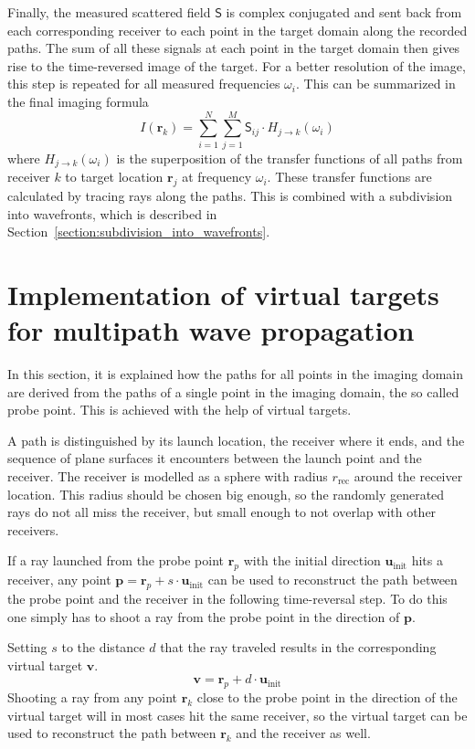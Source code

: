 Finally, the measured scattered field \(\mathsf{S}\) is complex conjugated and sent back from each corresponding receiver to each point in the target domain along the recorded paths.
The sum of all these signals at each point in the target domain then gives rise to the time-reversed image of the target.
For a better resolution of the image, this step is repeated for all measured frequencies \(\omega_i\).
This can be summarized in the final imaging formula
\begin{equation}
    I(\mathbf{r}_k) = \sum_{i=1}^{N} \sum_{j=1}^{M} \mathsf{S}_{ij} \cdot H_{j \rightarrow k}(\omega_i)
\end{equation}
where \(H_{j \rightarrow k}(\omega_i )\) is the superposition of the transfer functions of all paths from receiver \(k\) to target location \(\mathbf{r}_j\) at frequency \(\omega_i\).
These transfer functions are calculated by tracing rays along the paths.
This is combined with a subdivision into wavefronts, which is described in Section~\ref{section:subdivision_into_wavefronts}.


\section{Implementation of virtual targets for multipath wave propagation}\label{section:virtual_targets}
In this section, it is explained how the paths for all points in the imaging domain are derived from the paths of a single point in the imaging domain, the so called probe point.
This is achieved with the help of virtual targets.

A path is distinguished by its launch location, the receiver where it ends, and the sequence of plane surfaces it encounters between the launch point and the receiver.
The receiver is modelled as a sphere with radius \(r_{\text{rec}}\) around the receiver location.
This radius should be chosen big enough, so the randomly generated rays do not all miss the receiver, but small enough to not overlap with other receivers.

If a ray launched from the probe point \(\mathbf{r}_p\) with the initial direction \(\mathbf{u}_{\text{init}}\) hits a receiver, any point \(\mathbf{p} = \mathbf{r}_p + s \cdot \mathbf{u}_{\text{init}}\) can be used to reconstruct the path between the probe point and the receiver in the following time-reversal step.
To do this one simply has to shoot a ray from the probe point in the direction of \(\mathbf{p}\).

Setting \(s\) to the distance \(d\) that the ray traveled results in the corresponding virtual target \(\mathbf{v}\).
\begin{equation}\label{eq:visual_target}
    \mathbf{v} = \mathbf{r}_p + d \cdot \mathbf{u}_{\text{init}}
\end{equation}
Shooting a ray from any point \(\mathbf{r}_k\) close to the probe point in the direction of the virtual target will in most cases hit the same receiver, so the virtual target can be used to reconstruct the path between \(\mathbf{r}_k\) and the receiver as well.


